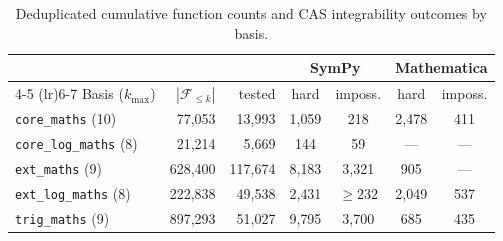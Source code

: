 \documentclass[preprint,12pt,authoryear]{elsarticle}
\newcommand{\Fleq}{\mathcal{F}_{\leq k}}
\begin{document}
\begin{table}[t]
\centering
\caption{Deduplicated cumulative function counts and CAS integrability outcomes by basis.}
\label{tab:sizes}
\begin{tabular}{lrrcccc}
\toprule
 & & & \multicolumn{2}{c}{SymPy} & \multicolumn{2}{c}{Mathematica} \\
\cmidrule(lr){4-5} \cmidrule(lr){6-7}
Basis ($k_{\max}$) & $|\Fleq|$ & tested & hard & imposs. & hard & imposs. \\
\midrule
\texttt{core\_maths} (10)     & 77{,}053  & 13{,}993  & 1{,}059       & 218  & 2{,}478       & 411            \\
\texttt{core\_log\_maths} (8) & 21{,}214   & 5{,}669       & 144           & 59  & ---           & ---            \\
\texttt{ext\_maths} (9)       & 628{,}400  & 117{,}674 & 8{,}183       & 3{,}321 & 905           & ---            \\
\texttt{ext\_log\_maths} (8)  & 222{,}838  & 49{,}538  & 2{,}431       & ${\geq}232$   & 2{,}049       & 537  \\
\texttt{trig\_maths} (9)      & 897{,}293 & 51{,}027 & 9{,}795    & 3{,}700 & 685       & 435            \\
\bottomrule
\end{tabular}
\end{table}
\end{document}
